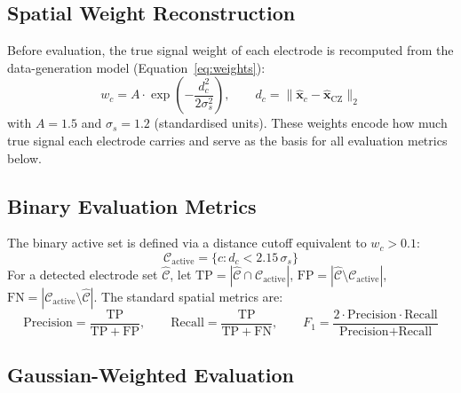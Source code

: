 \documentclass[12pt, a4paper]{article}
\begin{document}
\subsection{Spatial Weight Reconstruction}\label{sec:weight_recon}

Before evaluation, the true signal weight of each electrode is recomputed
from the data-generation model (Equation~\ref{eq:weights}):
\begin{equation}
  w_c = A\cdot\exp\!\left(-\frac{d_c^2}{2\sigma_s^2}\right),
  \qquad d_c = \|\hat{\mathbf{x}}_c - \hat{\mathbf{x}}_\text{CZ}\|_2
\end{equation}
with $A = 1.5$ and $\sigma_s = 1.2$ (standardised units).
These weights encode how much true signal each electrode carries and serve
as the basis for all evaluation metrics below.

\subsection{Binary Evaluation Metrics}\label{sec:binary}

The binary active set is defined via a distance cutoff equivalent to
$w_c > 0.1$:
\begin{equation}
  \mathcal{C}_\text{active} = \{c : d_c < 2.15\,\sigma_s\}
\end{equation}
For a detected electrode set $\hat{\mathcal{C}}$, let
$\mathrm{TP} = |\hat{\mathcal{C}} \cap \mathcal{C}_\text{active}|$,
$\mathrm{FP} = |\hat{\mathcal{C}} \setminus \mathcal{C}_\text{active}|$,
$\mathrm{FN} = |\mathcal{C}_\text{active} \setminus \hat{\mathcal{C}}|$.
The standard spatial metrics are:
\begin{equation}\label{eq:binary_metrics}
  \text{Precision} = \frac{\mathrm{TP}}{\mathrm{TP}+\mathrm{FP}}, \qquad
  \text{Recall}    = \frac{\mathrm{TP}}{\mathrm{TP}+\mathrm{FN}}, \qquad
  F_1 = \frac{2\cdot\text{Precision}\cdot\text{Recall}}
             {\text{Precision}+\text{Recall}}
\end{equation}

\subsection{Gaussian-Weighted Evaluation}\label{sec:weighted}
\end{document}
